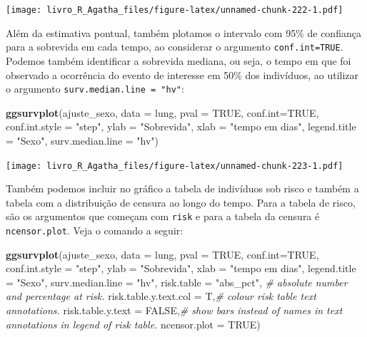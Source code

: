 \documentclass[
]{book}
\newenvironment{Shaded}{\begin{snugshade}}{\end{snugshade}}
\newcommand{\CommentTok}[1]{\textcolor[rgb]{0.56,0.35,0.01}{\textit{#1}}}
\newcommand{\DataTypeTok}[1]{\textcolor[rgb]{0.13,0.29,0.53}{#1}}
\newcommand{\KeywordTok}[1]{\textcolor[rgb]{0.13,0.29,0.53}{\textbf{#1}}}
\newcommand{\NormalTok}[1]{#1}
\newcommand{\OtherTok}[1]{\textcolor[rgb]{0.56,0.35,0.01}{#1}}
\newcommand{\StringTok}[1]{\textcolor[rgb]{0.31,0.60,0.02}{#1}}
\begin{document}
\texttt{[image: livro\_R\_Agatha\_files/figure-latex/unnamed-chunk-222-1.pdf]}

Além da estimativa pontual, também plotamos o intervalo com 95\% de confiança para a sobrevida em cada tempo, ao considerar o argumento \texttt{conf.int=TRUE}. Podemos também identificar a sobrevida mediana, ou seja, o tempo em que foi observado a ocorrência do evento de interesse em 50\% dos indivíduos, ao utilizar o argumento \texttt{surv.median.line\ =\ "hv"}:

\begin{Shaded}
\begin{Highlighting}[]
\KeywordTok{ggsurvplot}\NormalTok{(ajuste_sexo, }\DataTypeTok{data =}\NormalTok{ lung,}
           \DataTypeTok{pval =} \OtherTok{TRUE}\NormalTok{, }\DataTypeTok{conf.int=}\OtherTok{TRUE}\NormalTok{, }\DataTypeTok{conf.int.style =} \StringTok{"step"}\NormalTok{,}
           \DataTypeTok{ylab =} \StringTok{"Sobrevida"}\NormalTok{, }\DataTypeTok{xlab =} \StringTok{"tempo em dias"}\NormalTok{, }\DataTypeTok{legend.title =} \StringTok{"Sexo"}\NormalTok{, }\DataTypeTok{surv.median.line =} \StringTok{"hv"}\NormalTok{)  }
\end{Highlighting}
\end{Shaded}

\texttt{[image: livro\_R\_Agatha\_files/figure-latex/unnamed-chunk-223-1.pdf]}

Também podemos incluir no gráfico a tabela de indivíduos sob risco e também a tabela com a distribuição de censura ao longo do tempo. Para a tabela de risco, são os argumentos que começam com \texttt{risk} e para a tabela da censura é \texttt{ncensor.plot}. Veja o comando a seguir:

\begin{Shaded}
\begin{Highlighting}[]
\KeywordTok{ggsurvplot}\NormalTok{(ajuste_sexo, }\DataTypeTok{data =}\NormalTok{ lung,}
           \DataTypeTok{pval =} \OtherTok{TRUE}\NormalTok{, }\DataTypeTok{conf.int=}\OtherTok{TRUE}\NormalTok{, }\DataTypeTok{conf.int.style =} \StringTok{"step"}\NormalTok{,}
           \DataTypeTok{ylab =} \StringTok{"Sobrevida"}\NormalTok{, }\DataTypeTok{xlab =} \StringTok{"tempo em dias"}\NormalTok{, }\DataTypeTok{legend.title =} \StringTok{"Sexo"}\NormalTok{, }\DataTypeTok{surv.median.line =} \StringTok{"hv"}\NormalTok{,}
  \DataTypeTok{risk.table =} \StringTok{"abs_pct"}\NormalTok{,  }\CommentTok{# absolute number and percentage at risk.}
   \DataTypeTok{risk.table.y.text.col =}\NormalTok{ T,}\CommentTok{# colour risk table text annotations.}
  \DataTypeTok{risk.table.y.text =} \OtherTok{FALSE}\NormalTok{,}\CommentTok{# show bars instead of names in text annotations in legend of risk table. }
  \DataTypeTok{ncensor.plot =} \OtherTok{TRUE}\NormalTok{)}
\end{Highlighting}
\end{Shaded}
\end{document}
